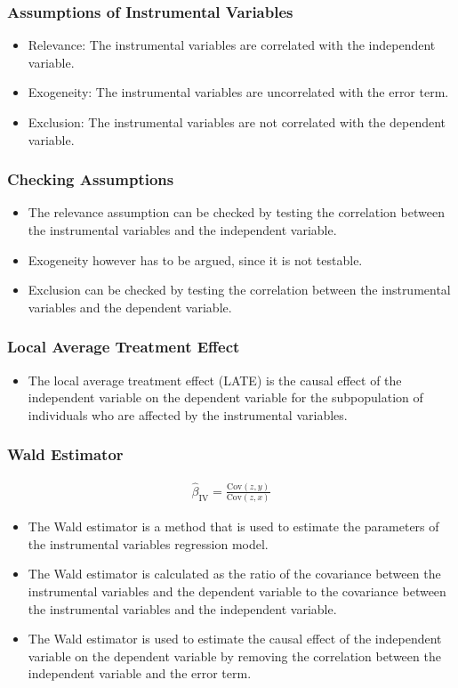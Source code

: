 \documentclass[serif, 9pt, aspectratio=32]{beamer}
\begin{document}
\begin{frame}
    \frametitle{Assumptions of Instrumental Variables}
    \begin{itemize}
        \setlength{\itemsep}{2em}
        \item Relevance: The instrumental variables are correlated with the independent variable.
        \item Exogeneity: The instrumental variables are uncorrelated with the error term.
        \item Exclusion: The instrumental variables are not correlated with the dependent variable.
    \end{itemize}
\end{frame}

\begin{frame}
    \frametitle{Checking Assumptions}
    \begin{itemize}
        \setlength{\itemsep}{2em}
        \item The relevance assumption can be checked by testing the correlation between the instrumental variables and the independent variable.
        \item Exogeneity however has to be argued, since it is not testable.
        \item Exclusion can be checked by testing the correlation between the instrumental variables and the dependent variable.
    \end{itemize}
\end{frame}

\begin{frame}
    \frametitle{Local Average Treatment Effect}
    \begin{itemize}
        \setlength{\itemsep}{2em}
        \item The local average treatment effect (LATE) is the causal effect of the independent variable on the dependent variable for the subpopulation of individuals who are affected by the instrumental variables.
    \end{itemize}
\end{frame}

\begin{frame}
    \frametitle{Wald Estimator}
    \begin{align}
        \hat{\beta}_{\text{IV}} = \frac{\text{Cov}(z, y)}{\text{Cov}(z, x)}
    \end{align}
    \begin{itemize}
        \setlength{\itemsep}{2em}
        \item The Wald estimator is a method that is used to estimate the parameters of the instrumental variables regression model.
        \item The Wald estimator is calculated as the ratio of the covariance between the instrumental variables and the dependent variable to the covariance between the instrumental variables and the independent variable.
        \item The Wald estimator is used to estimate the causal effect of the independent variable on the dependent variable by removing the correlation between the independent variable and the error term.
    \end{itemize}
\end{frame}
\end{document}
